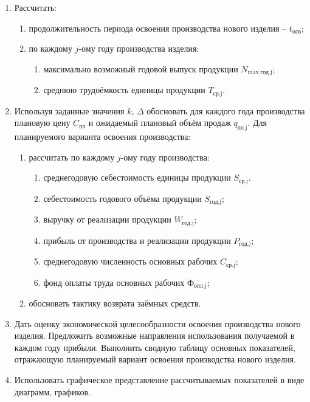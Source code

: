 \begin{enumerate}
\item Рассчитать:
    \begin{enumerate}
        \item продолжительность периода освоения производства нового изделия -- $t_{\text{осв}}$;
        \item по каждому $j$-ому году производства изделия:
        \begin{enumerate}
            \item максимально возможный годовой выпуск продукции $N_{\text{max.год.j}}$;
            \item среднюю трудоёмкость единицы продукции $T_{\text{ср.j}}$.
        \end{enumerate}
    \end{enumerate}

\item Используя заданные значения $k$, $\Delta$ обосновать для каждого года
    производства плановую цену $C_{\text{пл}}$ и ожидаемый плановый объём продаж
    $q_{\text{пл.j}}$. Для планируемого варианта освоения производства:
    \begin{enumerate}
        \item рассчитать по каждому $j$-ому году производства:
        \begin{enumerate}
            \item среднегодовую себестоимость единицы продукции $S_{\text{ср.j}}$.
            \item себестоимость годового объёма продукции $S_{\text{год.j}}$;
            \item выручку от реализации продукции $W_{\text{год.j}}$;
            \item прибыль от производства и реализации продукции $P_{\text{год.j}}$;
            \item среднегодовую численность основных рабочих $C_{\text{ср.j}}$;
            \item фонд оплаты труда основных рабочих $\text{Ф}_{\text{опл.j}}$;
        \end{enumerate}
        \item обосновать тактику возврата заёмных средств.
    \end{enumerate}

\item Дать оценку экономической целесообразности освоения производства нового изделия.
    Предложить возможные направления использования получаемой в каждом году прибыли.
    Выполнить сводную таблицу основных показателей, отражающую планируемый вариант
    освоения производства нового изделия.

\item Использовать графическое представление рассчитываемых показателей в виде
    диаграмм, графиков.
\end{enumerate}

